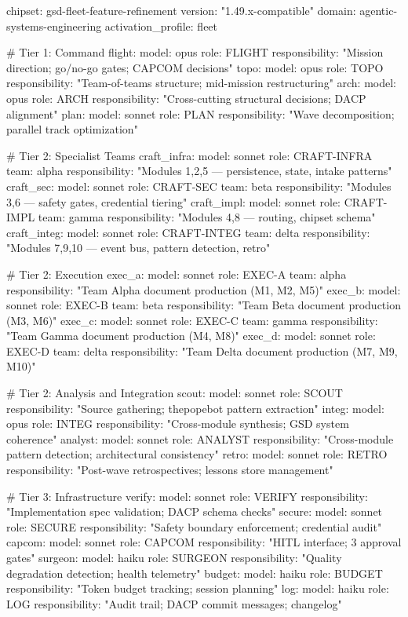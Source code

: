 \documentclass[11pt,letterpaper]{article}
\begin{document}
\begin{asciibox}
chipset: gsd-fleet-feature-refinement
version: "1.49.x-compatible"
domain: agentic-systems-engineering
activation\_profile: fleet

\# Tier 1: Command
flight:
  model: opus
  role: FLIGHT
  responsibility: "Mission direction; go/no-go gates; CAPCOM decisions"
topo:
  model: opus
  role: TOPO
  responsibility: "Team-of-teams structure; mid-mission restructuring"
arch:
  model: opus
  role: ARCH
  responsibility: "Cross-cutting structural decisions; DACP alignment"
plan:
  model: sonnet
  role: PLAN
  responsibility: "Wave decomposition; parallel track optimization"

\# Tier 2: Specialist Teams
craft\_infra:
  model: sonnet
  role: CRAFT-INFRA
  team: alpha
  responsibility: "Modules 1,2,5 — persistence, state, intake patterns"
craft\_sec:
  model: sonnet
  role: CRAFT-SEC
  team: beta
  responsibility: "Modules 3,6 — safety gates, credential tiering"
craft\_impl:
  model: sonnet
  role: CRAFT-IMPL
  team: gamma
  responsibility: "Modules 4,8 — routing, chipset schema"
craft\_integ:
  model: sonnet
  role: CRAFT-INTEG
  team: delta
  responsibility: "Modules 7,9,10 — event bus, pattern detection, retro"

\# Tier 2: Execution
exec\_a:
  model: sonnet
  role: EXEC-A
  team: alpha
  responsibility: "Team Alpha document production (M1, M2, M5)"
exec\_b:
  model: sonnet
  role: EXEC-B
  team: beta
  responsibility: "Team Beta document production (M3, M6)"
exec\_c:
  model: sonnet
  role: EXEC-C
  team: gamma
  responsibility: "Team Gamma document production (M4, M8)"
exec\_d:
  model: sonnet
  role: EXEC-D
  team: delta
  responsibility: "Team Delta document production (M7, M9, M10)"

\# Tier 2: Analysis and Integration
scout:
  model: sonnet
  role: SCOUT
  responsibility: "Source gathering; thepopebot pattern extraction"
integ:
  model: opus
  role: INTEG
  responsibility: "Cross-module synthesis; GSD system coherence"
analyst:
  model: sonnet
  role: ANALYST
  responsibility: "Cross-module pattern detection; architectural consistency"
retro:
  model: sonnet
  role: RETRO
  responsibility: "Post-wave retrospectives; lessons store management"

\# Tier 3: Infrastructure
verify:
  model: sonnet
  role: VERIFY
  responsibility: "Implementation spec validation; DACP schema checks"
secure:
  model: sonnet
  role: SECURE
  responsibility: "Safety boundary enforcement; credential audit"
capcom:
  model: sonnet
  role: CAPCOM
  responsibility: "HITL interface; 3 approval gates"
surgeon:
  model: haiku
  role: SURGEON
  responsibility: "Quality degradation detection; health telemetry"
budget:
  model: haiku
  role: BUDGET
  responsibility: "Token budget tracking; session planning"
log:
  model: haiku
  role: LOG
  responsibility: "Audit trail; DACP commit messages; changelog"
\end{asciibox}
\end{document}
